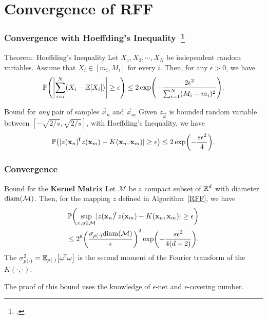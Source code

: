 \documentclass[10pt]{../Formats/RU}
\begin{document}
\section{Convergence of RFF}
\begin{frame}
  \frametitle{Convergence with Hoeffding's Inequality~\footcite{vershynin_hdp}}
  \begin{alertblock}{Theorem: Hoeffding's Inequality}
    Let $X_1, X_2,\cdots, X_N$ be independent random variables. Assume that $X_i \in [m_i, M_i]$ for every $i$. Then, for any $\epsilon > 0$, we have
    \[
    \P{\abs*{\sum_{i=i}^{N}(X_i-\E{X_i})}\geq \epsilon} \leq 2\exp\parens*{-\frac{2\epsilon^2}{\sum_{i=1}^{N}(M_i-m_i)^2}}.
    \]
  \end{alertblock}
  \begin{exampleblock}{Bound for \emph{any} pair of samples $\vec{x}_n$ and $\vec{x}_m$}
    Given $z_{\vec{\omega}}$ is bounded random variable between $[-\sqrt{2/s}, \sqrt{2/s}]$, with Hoeffding's Inequality, we have
    \begin{align*}
      \P{\abs{z(\vec{x}_n)\trn z(\vec{x}_m)-K(\vec{x}_n, \vec{x}_m)}\geq \epsilon} \leq 2\exp\parens*{-\frac{s\epsilon^2}{4}}.
    \end{align*}
  \end{exampleblock}
\end{frame}
\begin{frame}
  \frametitle{Convergence}
  \begin{exampleblock}{Bound for the \textbf{Kernel Matrix}}
    Let $\mathcal{M}$ be a compact subset of $\operatorname{\mathbb{R}}^d$ with diameter $\textnormal{diam}(\mathcal{M})$. Then, for the mapping $z$ defined in Algorithm~\ref{RFF}, we have
    \begin{align*}
      \P{\sup_{x,y\in\mathcal{M}}\abs{z(\vec{x}_n)\trn z(\vec{x}_m)-K(\vec{x}_n, \vec{x}_m)}\geq \epsilon} \\
      \leq 2^8\parens*{\frac{\sigma_{p(\cdot)}\textnormal{diam}(\mathcal{M})}{\epsilon}}^2\exp\parens*{-\frac{s\epsilon^2}{4(d+2)}}.
    \end{align*}
    The $\sigma_{p(\cdot)}^2=\mathbb{E}_{p(\cdot)}\bracks*{\vec{\omega}\trn\vec{\omega}}$ is the second moment of the Fourier transform of the $K(\cdot,\cdot)$.
  \end{exampleblock}
  The proof of this bound uses the knowledge of $\epsilon$-net and $\epsilon$-covering number.
\end{frame}
\end{document}
